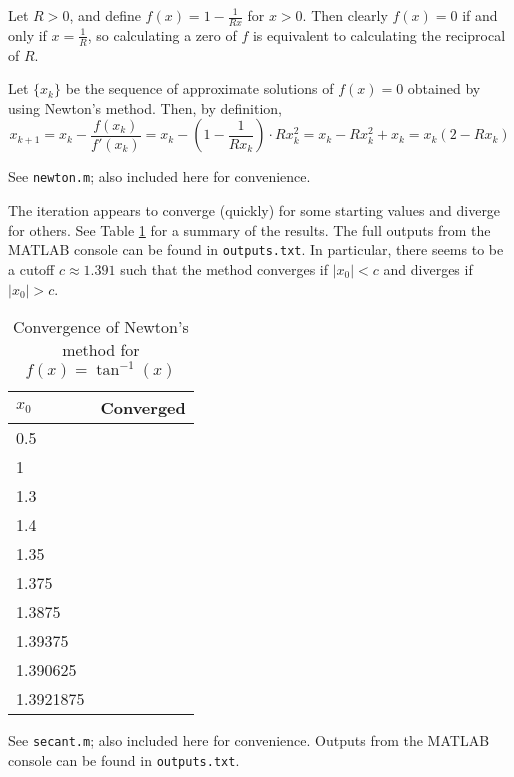 \documentclass{homework}
\newcommand{\xmark}{\ding{55}}
\begin{document}
\maketitle

\question Let $R > 0$, and define $f(x) = 1 - \frac{1}{Rx}$ for $x > 0$. Then clearly $f(x) = 0$ if and only if $x = \frac{1}{R}$, so calculating a zero of $f$ is equivalent to calculating the reciprocal of $R$.

Let $\{x_k\}$ be the sequence of approximate solutions of $f(x) = 0$ obtained by using Newton's method. Then, by definition,
\begin{equation}
	x_{k+1} = x_k - \frac{f(x_k)}{f'(x_k)} = x_k - \left(1-\frac{1}{Rx_k}\right)\cdot Rx_k^2 = x_k - Rx_k^2 + x_k = x_k(2-Rx_k)
\end{equation}

\question 
See \verb*|newton.m|; also included here for convenience.

The iteration appears to converge (quickly) for some starting values and diverge for others. See Table \ref{table:newton} for a summary of the results. The full outputs from the MATLAB console can be found in \verb*|outputs.txt|. In particular, there seems to be a cutoff $c \approx 1.391$ such that the method converges if $|x_0| < c$ and diverges if $|x_0| > c$.

\newcommand{\conv}{\textcolor{green!50!black}{\checkmark}}
\newcommand{\nconv}{\textcolor{red!50!black}{\xmark}}
\begin{table}[t]
	\centering
	\begin{tabular}{@{}ll@{}}
		\toprule
		$x_0$ & Converged \\
		\midrule
		0.5  & \conv \\ 
		1 & \conv \\
		1.3 & \conv \\
		1.4 & \nconv \\ 
		1.35 & \conv \\ 
		1.375 &  \conv \\
		1.3875 & \conv \\
		1.39375 & \nconv \\
		1.390625 & \conv \\
		1.3921875 & \nconv \\
		\bottomrule
	\end{tabular}
	\caption{Convergence of Newton's method for $f(x) = \tan^{-1}(x)$}
	\label{table:newton}
\end{table}

\question See \verb*|secant.m|; also included here for convenience. Outputs from the MATLAB console can be found in \verb*|outputs.txt|.

\end{document}
